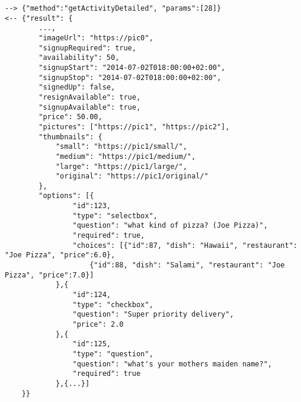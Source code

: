 \documentclass[a4paper]{scrreprt}
\begin{document}
\clearpage
\label{example:getActivityDetailedRegular}
\begin{lstlisting}
--> {"method":"getActivityDetailed", "params":[28]}
<-- {"result": {
        ...,
        "imageUrl": "https://pic0",
        "signupRequired": true,
        "availability": 50,
        "signupStart": "2014-07-02T018:00:00+02:00",
        "signupStop": "2014-07-02T018:00:00+02:00",
        "signedUp": false,
        "resignAvailable": true,
        "signupAvailable": true,
        "price": 50.00,
        "pictures": ["https://pic1", "https://pic2"],
        "thumbnails": {
            "small": "https://pic1/small/",
            "medium": "https://pic1/medium/",
            "large": "https://pic1/large/",
            "original": "https://pic1/original/"
        },
        "options": [{
            	"id":123,
                "type": "selectbox",
                "question": "what kind of pizza? (Joe Pizza)",
                "required": true,
                "choices": [{"id":87, "dish": "Hawaii", "restaurant": "Joe Pizza", "price":6.0},
                    {"id":88, "dish": "Salami", "restaurant": "Joe Pizza", "price":7.0}]
            },{
            	"id":124,
                "type": "checkbox",
                "question": "Super priority delivery",
                "price": 2.0
            },{
            	"id":125,
                "type": "question",
                "question": "what's your mothers maiden name?",
                "required": true
            },{...}]
    }}
\end{lstlisting}

\clearpage
\end{document}
